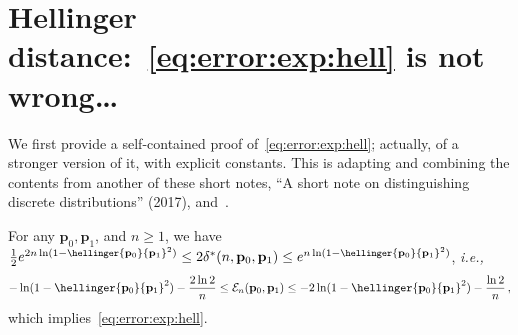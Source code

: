 \documentclass[10pt]{article}
\newcommand{\p}{\mathbf{p}}
\newcommand{\errproba}{\delta}
\newcommand{\ns}{n}
\newcommand{\errexp}{\mathcal{E}}
\begin{document}
\section{Hellinger distance:~\eqref{eq:error:exp:hell} is not wrong\dots}
We first provide a self-contained proof of~\eqref{eq:error:exp:hell}; actually, of a stronger version of it, with explicit constants. This is adapting and combining the contents from another of these short notes, ``A short note on distinguishing discrete distributions'' (2017), and~\cite[Theorem 4.7]{BarYossef:02}.
\begin{lemma}
	\label{lemma:errexponent:hell}
For any $\p_0,\p_1$, and $\ns \geq 1$, we have
$
	\frac{1}{2}e^{2\ns\ln(1-\hellinger{\p_0}{\p_1}^2)} \leq 2\errproba^\ast(\ns,\p_0,\p_1) \leq e^{\ns\ln(1-\hellinger{\p_0}{\p_1}^2)}
$, 
\emph{i.e.,}
\begin{equation}
			-\ln(1-\hellinger{\p_0}{\p_1}^2) - \frac{2\ln 2}{\ns} \leq \errexp_\ns(\p_0,\p_1)  \leq -2\ln(1-\hellinger{\p_0}{\p_1}^2) - \frac{\ln 2}{\ns}\,,
\end{equation}
which implies~\eqref{eq:error:exp:hell}.
\end{lemma}
\end{document}
